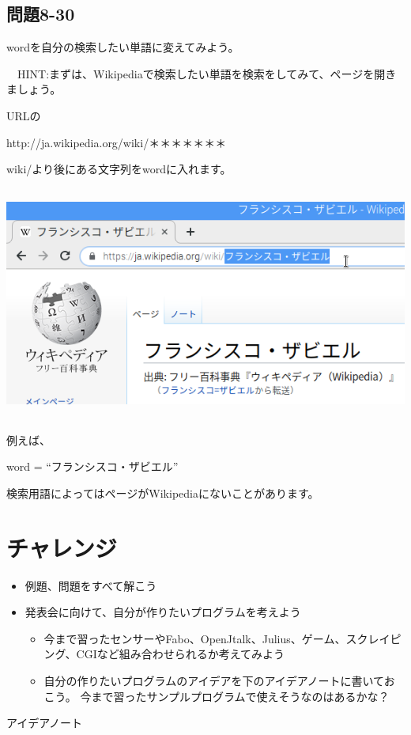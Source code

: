 \documentclass[a4paper,12pt,dvipdfmx]{jarticle}
\begin{document}
\bigskip

\subsection*{問題8-30}
wordを自分の検索したい単語に変えてみよう。

\ \ HINT:まずは、Wikipediaで検索したい単語を検索をしてみて、ページを開きましょう。

URLの

http://ja.wikipedia.org/wiki/＊＊＊＊＊＊＊

wiki/より後にある文字列をwordに入れます。



\begin{center}
\includegraphics[width=16.016cm,height=7.684cm]{textbook-img062.png}

\end{center}
例えば、

word = “フランシスコ・ザビエル”

検索用語によってはページがWikipediaにないことがあります。


\bigskip

\clearpage\section{チャレンジ}
\begin{itemize}
\item 例題、問題をすべて解こう
\item
発表会に向けて、自分が作りたいプログラムを考えよう

\begin{itemize}
\item
今まで習ったセンサーやFabo、OpenJtalk、Julius、ゲーム、スクレイピング、CGIなど組み合わせられるか考えてみよう
\item
自分の作りたいプログラムのアイデアを下のアイデアノートに書いておこう。
		今まで習ったサンプルプログラムで使えそうなのはあるかな？
\end{itemize}
\end{itemize}
アイデアノート
\end{document}
